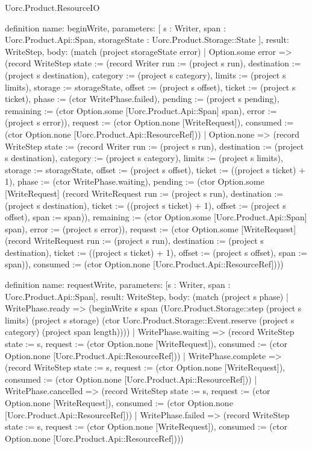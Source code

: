 \begin{lexlean}{Uorc.Product.ResourceIO}
\begin{semanticmodule}
definition{
  name: beginWrite,
  parameters: [
    s : Writer,
    span : Uorc.Product.Api::Span,
    storageState : Uorc.Product.Storage::State
  ],
  result: WriteStep,
  body: (match (project storageState error)
    | Option.some error => (record WriteStep {state := (record Writer {run := (project s run), destination := (project s destination), category := (project s category), limits := (project s limits), storage := storageState, offset := (project s offset), ticket := (project s ticket), phase := (ctor WritePhase.failed), pending := (project s pending), remaining := (ctor Option.some [Uorc.Product.Api::Span] span), error := (project s error)}), request := (ctor Option.none [WriteRequest]), consumed := (ctor Option.none [Uorc.Product.Api::ResourceRef])})
    | Option.none => (record WriteStep {state := (record Writer {run := (project s run), destination := (project s destination), category := (project s category), limits := (project s limits), storage := storageState, offset := (project s offset), ticket := ((project s ticket) + 1), phase := (ctor WritePhase.waiting), pending := (ctor Option.some [WriteRequest] (record WriteRequest {run := (project s run), destination := (project s destination), ticket := ((project s ticket) + 1), offset := (project s offset), span := span})), remaining := (ctor Option.some [Uorc.Product.Api::Span] span), error := (project s error)}), request := (ctor Option.some [WriteRequest] (record WriteRequest {run := (project s run), destination := (project s destination), ticket := ((project s ticket) + 1), offset := (project s offset), span := span})), consumed := (ctor Option.none [Uorc.Product.Api::ResourceRef])}))
}

definition{
  name: requestWrite,
  parameters: [s : Writer, span : Uorc.Product.Api::Span],
  result: WriteStep,
  body: (match (project s phase)
    | WritePhase.ready => (beginWrite s span (Uorc.Product.Storage::step (project s limits) (project s storage) (ctor Uorc.Product.Storage::Event.reserve (project s category) (project span length))))
    | WritePhase.waiting => (record WriteStep {state := s, request := (ctor Option.none [WriteRequest]), consumed := (ctor Option.none [Uorc.Product.Api::ResourceRef])})
    | WritePhase.complete => (record WriteStep {state := s, request := (ctor Option.none [WriteRequest]), consumed := (ctor Option.none [Uorc.Product.Api::ResourceRef])})
    | WritePhase.cancelled => (record WriteStep {state := s, request := (ctor Option.none [WriteRequest]), consumed := (ctor Option.none [Uorc.Product.Api::ResourceRef])})
    | WritePhase.failed => (record WriteStep {state := s, request := (ctor Option.none [WriteRequest]), consumed := (ctor Option.none [Uorc.Product.Api::ResourceRef])}))
}


\end{semanticmodule}
\end{lexlean}
